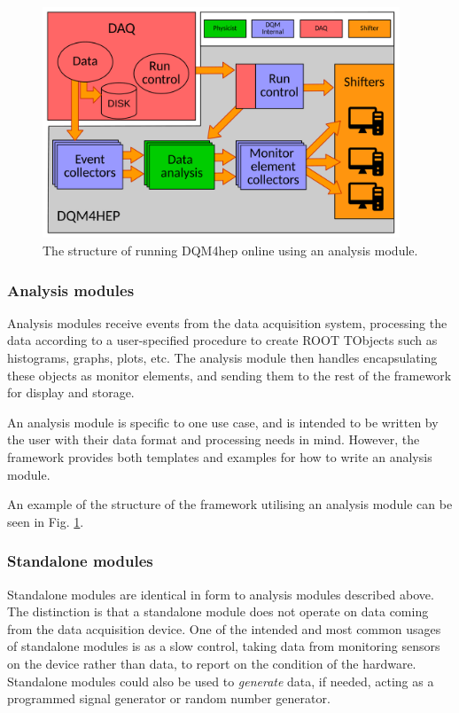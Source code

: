 \begin{figure}[p]
	\centering
	\includegraphics[width=0.95\textwidth]{../Pictures/AnalysisModuleArchitecture.pdf}
	\caption{The structure of running \acrshort{DQM4hep} online using an analysis module.}
	\label{figure:daq/dqm4hep/analysis-module}
\end{figure}

\subsubsection{Analysis modules}
Analysis modules receive events from the data acquisition system, processing the data according to a user-specified procedure to create ROOT TObjects such as histograms, graphs, plots, etc. The analysis module then handles encapsulating these objects as monitor elements, and sending them to the rest of the framework for display and storage. 

An analysis module is specific to one use case, and is intended to be written by the user with their data format and processing needs in mind. However, the framework provides both templates and examples for how to write an analysis module. 

An example of the structure of the framework utilising an analysis module can be seen in Fig. \ref{figure:daq/dqm4hep/analysis-module}.

\subsubsection{Standalone modules}
Standalone modules are identical in form to analysis modules described above. The distinction is that a standalone module does not operate on data coming from the data acquisition device. One of the intended and most common usages of standalone modules is as a slow control, taking data from monitoring sensors on the device rather than data, to report on the condition of the hardware. Standalone modules could also be used to \emph{generate} data, if needed, acting as a programmed signal generator or random number generator. 


